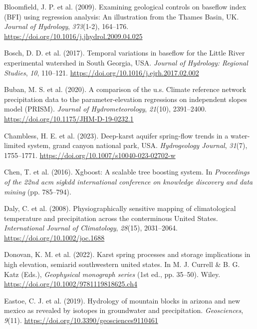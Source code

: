 \documentclass[
]{agujournal2019}
\newlength{\cslhangindent}
\newenvironment{CSLReferences}[2] %
 {\begin{list}{}{%
  \setlength{\itemindent}{0pt}
  \setlength{\leftmargin}{0pt}
  \setlength{\parsep}{0pt}
  \ifodd #1
   \setlength{\leftmargin}{\cslhangindent}
   \setlength{\itemindent}{-1\cslhangindent}
  \fi
  \setlength{\itemsep}{#2\baselineskip}}}
 {\end{list}}
\begin{document}
\begin{CSLReferences}{1}{0}
Bloomfield, J. P. et al. (2009). Examining geological controls on
baseflow index (BFI) using regression analysis: An illustration from the
Thames Basin, UK. \emph{Journal of Hydrology}, \emph{373}(1-2),
164--176. \url{https://doi.org/10.1016/j.jhydrol.2009.04.025}

Bosch, D. D. et al. (2017). Temporal variations in baseflow for the
Little River experimental watershed in South Georgia, USA. \emph{Journal
of Hydrology: Regional Studies}, \emph{10}, 110--121.
\url{https://doi.org/10.1016/j.ejrh.2017.02.002}

Buban, M. S. et al. (2020). A comparison of the u.s. Climate reference
network precipitation data to the parameter-elevation regressions on
independent slopes model (PRISM). \emph{Journal of Hydrometeorology},
\emph{21}(10), 2391--2400. \url{https://doi.org/10.1175/JHM-D-19-0232.1}

Chambless, H. E. et al. (2023). Deep-karst aquifer spring-flow trends in
a water-limited system, grand canyon national park, {USA}.
\emph{Hydrogeology Journal}, \emph{31}(7), 1755--1771.
\url{https://doi.org/10.1007/s10040-023-02702-w}

Chen, T. et al. (2016). Xgboost: A scalable tree boosting system. In
\emph{Proceedings of the 22nd acm sigkdd international conference on
knowledge discovery and data mining} (pp. 785--794).

Daly, C. et al. (2008). Physiographically sensitive mapping of
climatological temperature and precipitation across the conterminous
United States. \emph{International Journal of Climatology},
\emph{28}(15), 2031--2064. \url{https://doi.org/10.1002/joc.1688}

Donovan, K. M. et al. (2022). Karst spring processes and storage
implications in high elevation, semiarid southwestern united states. In
M. J. Currell \& B. G. Katz (Eds.), \emph{Geophysical monograph series}
(1st ed., pp. 35--50). Wiley.
\url{https://doi.org/10.1002/9781119818625.ch4}

Eastoe, C. J. et al. (2019). Hydrology of mountain blocks in arizona and
new mexico as revealed by isotopes in groundwater and precipitation.
\emph{Geosciences}, \emph{9}(11).
\url{https://doi.org/10.3390/geosciences9110461}


\end{CSLReferences}
\end{document}
